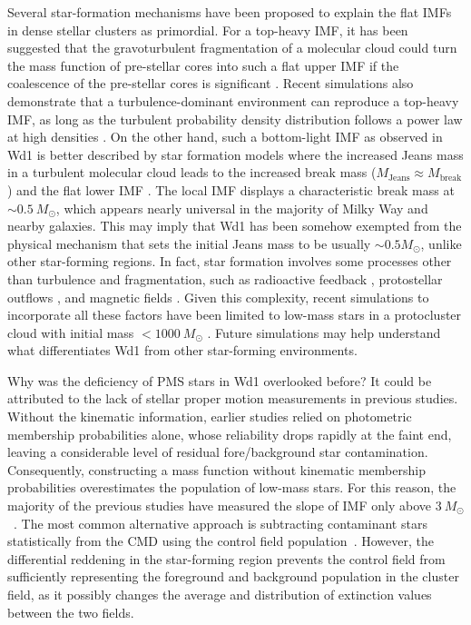 \documentclass[12pt]{ucsddissertation}
\begin{document}
\begin{CJK*}{UTF8}{gbsn}
Several star-formation mechanisms have been proposed to explain the flat IMFs in dense stellar clusters as primordial. For a top-heavy IMF, it has been suggested that the gravoturbulent fragmentation of a molecular cloud could turn the mass function of pre-stellar cores into such a flat upper IMF if the coalescence of the pre-stellar cores is significant \citep[][]{Dib-2007}. Recent simulations also demonstrate that a turbulence-dominant environment can reproduce a top-heavy IMF, as long as the turbulent probability density distribution follows a power law at high densities \citep[][]{Lee-2018}. On the other hand, such a bottom-light IMF as observed in Wd1 is better described by star formation models where the increased Jeans mass in a turbulent molecular cloud leads to the increased break mass ($M_\mathrm{Jeans}\approx M_\mathrm{break}$) and the flat lower IMF \cite{Larson-2005, Bonnell-2006}. The local IMF displays a characteristic break mass at $\sim0.5~M_\odot$, which appears nearly universal in the majority of Milky Way and nearby galaxies. This may imply that Wd1 has been somehow exempted from the physical mechanism that sets the initial Jeans mass to be usually $\sim 0.5 M_\odot$, unlike other star-forming regions. In fact, star formation involves some processes other than turbulence and fragmentation, such as radioactive feedback \citep[][]{Bate-2009a}, protostellar outflows \citep[][]{Krumholz-2012}, and magnetic fields \citep[][]{Hennebelle-2011}. Given this complexity, recent simulations to incorporate all these factors have been limited to low-mass stars in a protocluster cloud with initial mass $< 1000~M_\odot$ \citep[][]{Cunningham-2018, Li-2018}. Future simulations may help understand what differentiates Wd1 from other star-forming environments. 

Why was the deficiency of PMS stars in Wd1 overlooked before? It could be attributed to the lack of stellar proper motion measurements in previous studies. Without the kinematic information, earlier studies relied on photometric membership probabilities alone, whose reliability drops rapidly at the faint end, leaving a considerable level of residual fore/background star contamination. Consequently, constructing a mass function without kinematic membership probabilities overestimates the population of low-mass stars. For this reason, the majority of the previous studies have measured the slope of IMF only above $3~M_{\odot}$~\cite{Brandner-2008, Gennaro-2011, Lim-2013}. The most common alternative approach is subtracting contaminant stars statistically from the CMD using the control field population~\cite{Andersen-2017}. However, the differential reddening in the star-forming region prevents the control field from sufficiently representing the foreground and background population in the cluster field, as it possibly changes the average and distribution of extinction values between the two fields.
 

\end{CJK*}
\end{document}
